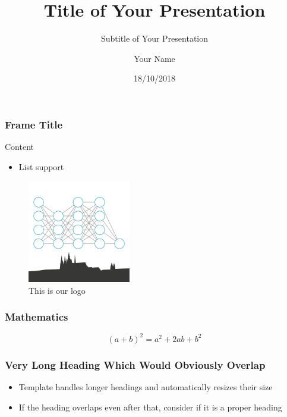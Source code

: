 \documentclass{beamer}
\title[Short Title]{Title of Your Presentation}
\subtitle{Subtitle of Your Presentation}
\author{Your Name}
\date{18/10/2018}
\begin{document}

\begin{frame}
  \frametitle{Frame Title}

  Content

  \begin{itemize}
    \item List support
  \end{itemize}

  \begin{figure}
      \includegraphics[width=0.4\textwidth]{logo}
      \caption{This is our logo}
      \label{fig:logo}
  \end{figure}

\end{frame}

\begin{frame}
  \frametitle{Mathematics}

  \[
    (a + b)^2 = a^2 + 2ab + b^2
  \]

\end{frame}

%
%
%
%

\begin{frame}
  \frametitle{Very Long Heading Which Would Obviously Overlap}

  \begin{itemize}
    \item Template handles longer headings and automatically resizes their size
    \item If the heading overlaps even after that, consider if it is a proper heading
  \end{itemize}

\end{frame}
\end{document}
